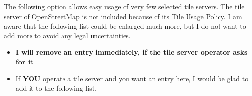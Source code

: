 The following option allows easy usage of very few selected tile servers.
The tile server of \href{https://openstreetmap.org/copyright}{OpenStreetMap}
is not included because of its
\href{https://operations.osmfoundation.org/policies/tiles/}{Tile Usage Policy}.
I am aware that the following list could be enlarged much more, but I do not
want to add more to avoid any legal uncertainties.

\begin{itemize}
\item\bfseries I will remove an entry immediately, if the tile server operator
  asks for it.
\item\mdseries If \textbf{YOU} operate a tile server and you want an entry here, I would be
  glad to add it to the following list.
\end{itemize}

